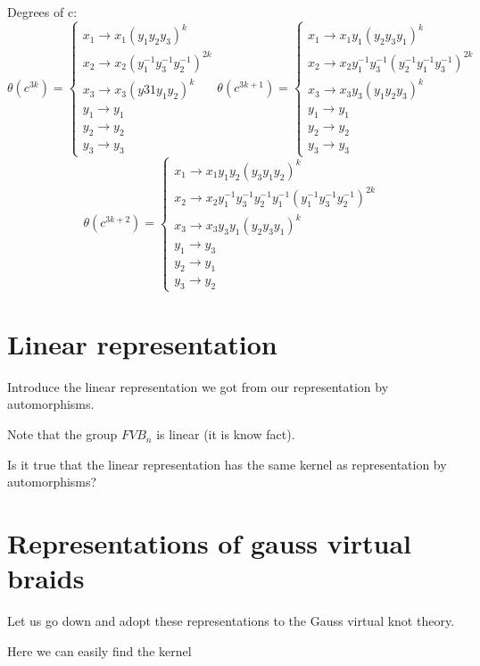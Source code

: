 \documentclass{article}
\begin{document}
Degrees of c:
$$
\theta(c^{3k}) =
\begin{cases}
	x_1 \rightarrow x_1 (y_1 y_2y_3)^{k}\\
	x_2 \rightarrow x_2 (y_1^{-1} y_3^{-1} y_2^{-1})^{2k}\\
	x_3 \rightarrow x_3 (y31 y_1 y_2)^{k}\\
	y_1 \rightarrow y_1\\
	y_2 \rightarrow y_2\\
	y_3 \rightarrow y_3
\end{cases}
\theta(c^{3k+1}) =
\begin{cases}
	x_1 \rightarrow x_1 y_1 (y_2 y_3 y_1)^{k}\\
	x_2 \rightarrow x_2 y_1^{-1} y_3^{-1}(y_2^{-1} y_1^{-1} y_3^{-1})^{2k}\\
	x_3 \rightarrow x_3 y_3 (y_1 y_2 y_3)^k\\
	y_1 \rightarrow y_1\\
	y_2 \rightarrow y_2\\
	y_3 \rightarrow y_3
\end{cases} 
$$
$$
\theta(c^{3k+2}) =
\begin{cases}
	x_1 \rightarrow x_1 y_1 y_2 (y_3 y_1 y_2)^{k} \\
	x_2 \rightarrow x_2 y_1^{-1} y_3^{-1} y_2^{-1} y_1^{-1} (y_1^{-1} y_3^{-1} y_2^{-1})^{2k}\\
	x_3 \rightarrow x_3 y_3 y_1 (y_2 y_3 y_1)^k\\
	y_1 \rightarrow y_3\\
	y_2 \rightarrow y_1\\
	y_3 \rightarrow y_2
\end{cases}
$$
\section{Linear representation}
Introduce the linear representation we got from our representation by automorphisms.

Note that the group $FVB_n$ is linear (it is know fact).

Is it true that the linear representation has the same kernel as representation by automorphisms?

\section{Representations of gauss virtual braids}
Let us go down and adopt these representations to the Gauss virtual knot theory.

Here we can easily find the kernel
\end{document}
